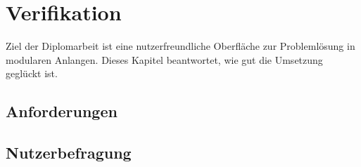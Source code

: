 \chapter{Verifikation}
\label{Verifikation}

Ziel der Diplomarbeit ist eine nutzerfreundliche Oberfläche zur Problemlösung in modularen Anlangen. Dieses Kapitel beantwortet, wie gut die Umsetzung geglückt ist.

\section{Anforderungen}

\section{Nutzerbefragung}